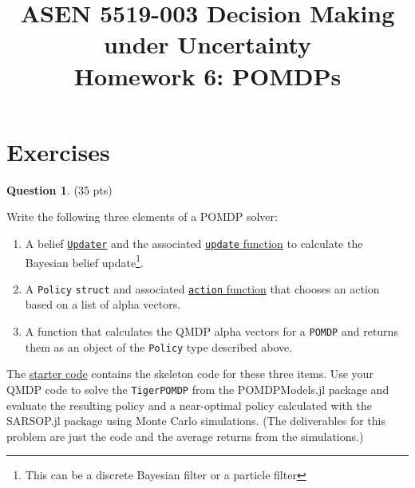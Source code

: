 \documentclass{article}
\title{ASEN 5519-003 Decision Making under Uncertainty\\
       Homework 6: POMDPs}
\theoremstyle{definition}
\newtheorem{question}[thm]{Question}
\begin{document}
\maketitle



\section{Exercises}

\begin{question} \label{q:tiger}
    (35 pts)

    Write the following three elements of a POMDP solver:
    \begin{enumerate}[noitemsep]
        \item A belief \href{https://juliapomdp.github.io/POMDPs.jl/stable/def_updater/}{\texttt{Updater}} and the associated \href{https://juliapomdp.github.io/POMDPs.jl/stable/api/#POMDPs.update}{\texttt{update} function} to calculate the Bayesian belief update\footnote{This can be a discrete Bayesian filter or a particle filter}.
        \item A \texttt{Policy} \texttt{struct} and associated \href{https://juliapomdp.github.io/POMDPs.jl/stable/api/#POMDPs.action}{\texttt{action} function} that chooses an action based on a list of alpha vectors.
        \item A function that calculates the QMDP alpha vectors for a \texttt{POMDP} and returns them as an object of the \texttt{Policy} type described above.
    \end{enumerate}
    The \href{https://github.com/zsunberg/CU-DMU-Materials/blob/master/hw/6-POMDPs/starter_code.jl}{starter code} contains the skeleton code for these three items. Use your QMDP code to solve the \texttt{TigerPOMDP} from the POMDPModels.jl package and evaluate the resulting policy and a near-optimal policy calculated with the SARSOP.jl package using Monte Carlo simulations. (The deliverables for this problem are just the code and the average returns from the simulations.)
\end{question}
\end{document}
